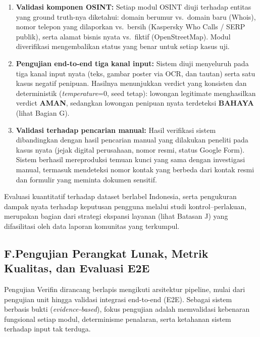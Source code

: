 \documentclass[12pt,a4paper]{article}
\begin{document}
\begin{enumerate}[label=\textbf{\arabic*.}]
\item \textbf{Validasi komponen OSINT:} Setiap modul OSINT diuji terhadap entitas yang ground
truth-nya diketahui: domain berumur vs.\ domain baru (Whois), nomor telepon yang dilaporkan vs.\
bersih (Kaspersky Who Calls / SERP publik), serta alamat bisnis nyata vs.\ fiktif (OpenStreetMap).
Modul diverifikasi mengembalikan status yang benar untuk setiap kasus uji.

\item \textbf{Pengujian end-to-end tiga kanal input:} Sistem diuji menyeluruh pada tiga kanal input
nyata (teks, gambar poster via OCR, dan tautan) serta satu kasus negatif penipuan. Hasilnya
menunjukkan verdict yang konsisten dan deterministik (\textit{temperature}=0, seed tetap):
lowongan legitimate menghasilkan verdict \textbf{AMAN}, sedangkan lowongan penipuan nyata
terdeteksi \textbf{BAHAYA} (lihat Bagian G).

\item \textbf{Validasi terhadap pencarian manual:} Hasil verifikasi sistem dibandingkan dengan hasil
pencarian manual yang dilakukan peneliti pada kasus nyata (jejak digital perusahaan, nomor resmi,
status Google Form). Sistem berhasil mereproduksi temuan kunci yang sama dengan investigasi
manual, termasuk mendeteksi nomor kontak yang berbeda dari kontak resmi dan formulir yang meminta
dokumen sensitif.
\end{enumerate}

Evaluasi kuantitatif terhadap dataset berlabel Indonesia, serta pengukuran dampak nyata
terhadap keputusan pengguna melalui studi kontrol--perlakuan, merupakan bagian dari strategi ekspansi
layanan (lihat Batasan J) yang difasilitasi oleh data laporan komunitas yang terkumpul.

\subsection*{F.\quad Pengujian Perangkat Lunak, Metrik Kualitas, dan Evaluasi E2E}
\phantomsection
{}

Pengujian Verifin dirancang berlapis mengikuti arsitektur pipeline, mulai dari pengujian unit
hingga validasi integrasi end-to-end (E2E). Sebagai sistem berbasis bukti (\textit{evidence-based}),
fokus pengujian adalah memvalidasi kebenaran fungsional setiap modul, determinisme penalaran,
serta ketahanan sistem terhadap input tak terduga.
\end{document}

